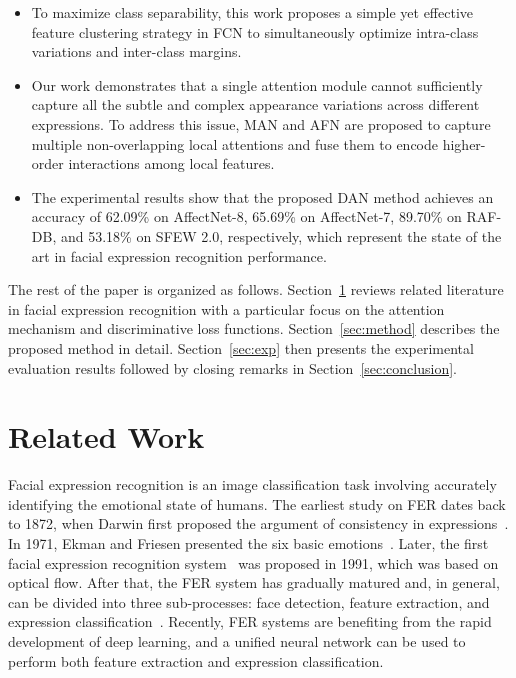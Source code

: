 \documentclass{article}
\begin{document}
\begin{itemize}

\item To maximize class separability, {this work} proposes a simple yet effective feature clustering strategy in FCN to simultaneously optimize intra-class variations and inter-class margins. 

\item {Our work} demonstrates that a single attention module cannot sufficiently capture all the subtle and complex appearance variations across different expressions. To address this issue, MAN and AFN {are proposed} to capture multiple non-overlapping local attentions and fuse them to encode higher-order interactions among local features.

\item The experimental results show that the proposed DAN method achieves an accuracy of 62.09\% on AffectNet-8, 65.69\% on AffectNet-7, 89.70\% on RAF-DB, and 53.18\% on SFEW 2.0, respectively, which represent the state of the art in facial expression recognition performance. 

\end{itemize}


The rest of the paper is organized as follows. Section~\ref{sec:related} reviews related literature in facial expression recognition with a particular focus on the attention mechanism and discriminative loss functions. Section~\ref{sec:method} describes the proposed method in detail. Section~\ref{sec:exp} then presents the experimental evaluation results followed by closing remarks in Section~\ref{sec:conclusion}.

\section{Related Work}
\label{sec:related}
Facial expression recognition is an image classification task involving accurately identifying the emotional state of humans. The earliest study on FER dates back to 1872, when Darwin first proposed the argument of consistency in expressions~\cite{darwin2015expression}. In 1971, Ekman and Friesen presented the six basic emotions~\cite{ekman1971constants}.
Later, the first facial expression recognition system~\cite{mase1991recognition} was proposed in 1991, which was based on optical flow. After that, the FER system has gradually matured and, in general, can be divided into three sub-processes: face detection, feature extraction, and expression classification~\cite{wu2012survey}. Recently, FER systems are benefiting from the rapid development of deep learning, and a unified neural network can be used to perform both feature extraction and expression classification. 
\end{document}
